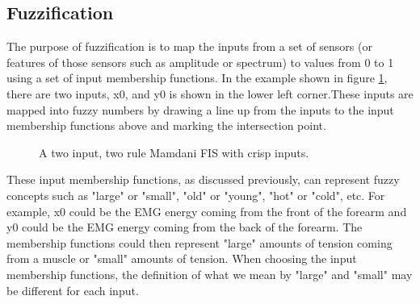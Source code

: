 \subsection{Fuzzification}

The purpose of fuzzification is to map the inputs from a set of sensors (or
features of those sensors such as amplitude or spectrum) to values from 0 to 1
using a set of input membership functions. In the example shown in figure \ref{fig:mamdaniFis},
there are two inputs, x0, and y0 is shown in the lower left corner.These inputs
are mapped into fuzzy numbers by drawing a line up from the inputs to the input
membership functions above and marking the intersection point.

\begin{figure}
\captionsetup{justification=centering,margin=2cm}
\centering
\setlength\fboxsep{0pt}
\setlength\fboxrule{0.7pt}
\caption{A two input, two rule Mamdani FIS with crisp inputs.}
\label{fig:mamdaniFis}
\end{figure}

These input membership functions, as discussed previously, can represent fuzzy concepts
such as "large" or "small", "old" or "young", "hot" or "cold", etc. For example, x0
could be the EMG energy coming from the front of the forearm and y0 could be the
EMG energy coming from the back of the forearm. The membership functions could
then represent "large" amounts of tension coming from a muscle or "small"
amounts of tension. When choosing the input membership functions, the definition
of what we mean by "large" and "small" may be different for each input.

